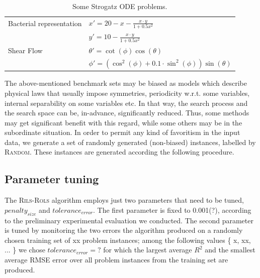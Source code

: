 \documentclass[a4paper,12pt]{elsarticle}
\begin{document}
\begin{itemize}
	
	\begin{table}
		\centering
		\begin{tabular}{ll} \\ \hline
			Bacterial representation &   $x' = 20 - x - \frac{x \cdot y}{1 + 0.5 x^2 }$ \\ 
			&   $y' = 10 - \frac{x \cdot y}{1 + 0.5 x^2  }$ \\ \hline
			Shear Flow               &  $\theta' = \cot(\phi)\cos(\theta)$ \\
			&  $ \phi'  = ( \cos^2(\phi) + 0.1 \cdot \sin^2 (\phi)) \sin(\theta) $ \\ \hline
		\end{tabular}
		\caption{Some Strogatz ODE problems.}
		\label{table:strogatz-ODEs}
	\end{table}
	
	
\end{itemize}
The above-mentioned benchmark sets may be biased as models which describe physical laws that usually impose   symmetries, periodicity w.r.t. some variables, internal separability on some variables etc. In that way, the search process and the search space can be, in-advance, significantly reduced. Thus, some methods may get significant benefit with this regard, while some others may be in the subordinate situation. 
In order to permit any kind of favoritism in the input data, we generate a set of randomly generated (non-biased) instances, labelled by \textsc{Random}. These instances are generated according the following procedure. 


\subsection{Parameter tuning}
The \textsc{Rils}-\textsc{Rols} algorithm employs just two parameters that need to be tuned, $penalty_{size}$ and $tolerance_{error}$. The first parameter is fixed to 0.001(?), according to the preliminary experimental evaluation we conducted. The second parameter is tuned by monitoring the two errors the algorithm produced on a randomly chosen training set of xx problem instances; among the following values \{ x, xx, ... \} we chose $tolerance_{error}=?$ for which the largest average $R^2$ and the smallest average RMSE error over all problem instances from the training set are produced. %
\end{document}
